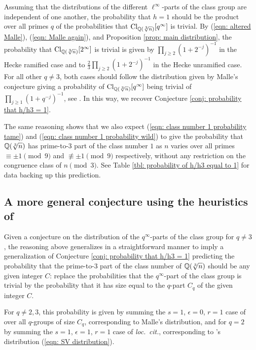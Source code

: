 \documentclass[11pt,a4paper]{amsart}
\def\Q{{\rm \mathbb{Q}}}
\def\Cl{{\rm Cl}}
\numberwithin{equation}{section}
\begin{document}
Assuming that the distributions of the different $\ell^\infty$-parts of the class group are independent of one another, the probability that $h = 1$ should be the product over all primes $q$ of the probabilities that $\Cl_{\Q(\sqrt[3]{n})}[q^\infty]$ is trivial. By (\ref{eqn: altered Malle}), (\ref{eqn: Malle again}), and Proposition \ref{prop: main distribution}, the probability that $\Cl_{\Q(\sqrt[3]{n})}[2^\infty]$ is trivial is given by $\prod_{j \ge 2} (1+2^{-j})^{-1}$ in the Hecke ramified case and to $\frac{2}{3}\prod_{j \ge 2}(1+2^{-j})^{-1}$ in the Hecke unramified case. For all other $q \neq 3$, both cases should follow the distribution given by Malle's conjecture giving a probability of $\Cl_{\Q(\sqrt[3]{n})}[q^\infty]$ being trivial of $\prod_{j \ge 1}(1+q^{-j})^{-1}$, see \cite[Lemma 12.5. and Proposition 7.1.]{SawinWood}. In this way, we recover Conjecture \ref{conj: probability that h/h3 = 1}. 

The same reasoning shows that we also expect  (\ref{eqn: class number 1 probability tame}) and (\ref{eqn: class number 1 probability wild}) to give the probability that $\Q(\sqrt[3]{n})$ has prime-to-$3$ part of the class number $1$ as $n$ varies over all primes $\equiv \pm 1 \pmod{9}$ and $\not\equiv \pm 1 \pmod{9}$ respectively, without any restriction on the congruence class of $n \pmod{3}$. See Table \ref{tbl: probability of h/h3 equal to 1} for data backing up this prediction. 

\subsection{A more general conjecture using the heuristics of \cite{SiadVenkatesh}} \label{subsec: spin conjecture derivation}

Given a conjecture on the distribution of the $q^\infty$-parts of the class group for $q \neq 3$, the reasoning above generalizes in a straightforward manner to imply a generalization of Conjecture \ref{conj: probability that h/h3 = 1} predicting the probability that the prime-to-$3$ part of the class number of $\Q(\sqrt[3]{n})$ should be any given integer $C$: replace the probabilities that the $q^\infty$-part of the class group is trivial by the probability that it has size equal to the $q$-part $C_q$ of the given integer $C$. 

For $q \neq 2,3$, this probability is given by summing the $s=1$, $\epsilon = 0$, $r=1$ case of \cite[Proposition 7.1.]{SawinWood} over all $q$-groups of size $C_q$, corresponding to Malle's distribution, and for $q=2$ by summing the $s=1$, $\epsilon = 1$, $r=1$ case of \textit{loc.\ cit.}, corresponding to \cite{SiadVenkatesh}'s distribution (\ref{eqn: SV distribution}). 
\end{document}
